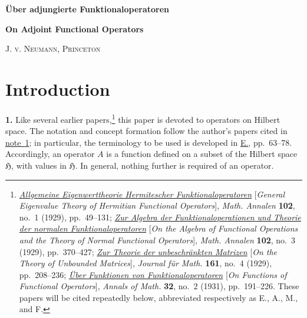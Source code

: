 \documentclass[fontsize=13pt,paper=b5,leqno,bookmarkpackage=false]{scrartcl}
\begin{document}


\label{article:on-adjoint-functional-operators}
\begingroup
\renewcommand{\thefootnote}{*}
\begin{center}
  {\Large\bfseries Über adjungierte Funktionaloperatoren\footnotemark[0]\par}
  \vspace{0.35em}
  {\Large\bfseries On Adjoint Functional Operators\par}
  \vspace{0.75em}
  {\scshape J. v. Neumann, Princeton\par}
\end{center}
\endgroup

\section*{Introduction}
\label{sec:introduction}

\label{intro:1}
\noindent\textbf{1.}
Like several earlier papers,\footnote{\label{fn:1}%
\hypertarget{bib:E}{\href{https://doi.org/10.1007/BF01782338}{%
\emph{Allgemeine Eigenwerttheorie Hermitescher Funktionaloperatoren}}}
[\emph{General Eigenvalue Theory of Hermitian Functional Operators}],
\emph{Math. Annalen} \textbf{102}, no.~1 (1929), pp.~49--131;
\hypertarget{bib:A}{\href{https://doi.org/10.1007/BF01782352}{%
\emph{Zur Algebra der Funktionaloperationen und Theorie
der normalen Funktionaloperatoren}}} [\emph{On the Algebra of Functional Operations and
the Theory of Normal Functional Operators}], \emph{Math. Annalen}
\textbf{102}, no.~3 (1929), pp.~370--427;
\hypertarget{bib:M}{\href{https://doi.org/10.1515/crll.1929.161.208}{%
\emph{Zur Theorie der unbeschränkten Matrizen}}}
[\emph{On the Theory of Unbounded Matrices}], \emph{Journal für Math.}
\textbf{161}, no.~4 (1929), pp.~208--236;
\hypertarget{bib:F}{\href{https://doi.org/10.2307/1968185}{%
\emph{Über Funktionen von Funktionaloperatoren}}}
[\emph{On Functions of Functional Operators}], \emph{Annals of Math.}
\textbf{32}, no.~2 (1931), pp.~191--226. These papers will be cited
repeatedly below, abbreviated respectively as E., A., M., and F.}
this paper is devoted to operators on Hilbert space. The notation and
concept formation follow the author's papers cited in
\hyperref[fn:1]{note~\ref*{fn:1}}; in particular, the terminology to be
used is developed in \hyperlink{bib:E}{E.}, pp.~63--78. Accordingly, an
operator \(A\) is a
function defined on a subset of the Hilbert space \(\mathfrak H\), with
values in \(\mathfrak H\). In general, nothing further is required of an
operator.
\end{document}
